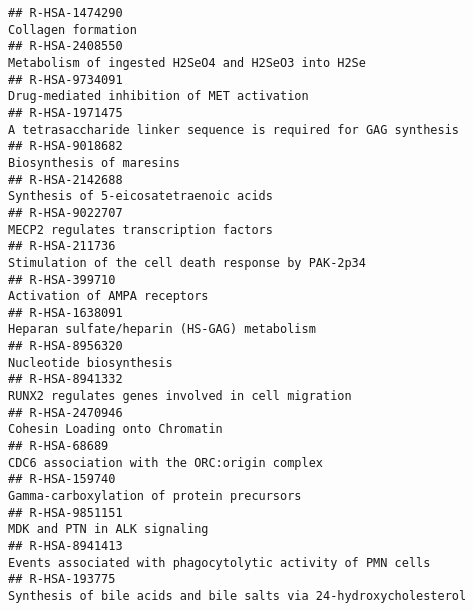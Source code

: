 \documentclass[
]{article}
\begin{document}
\begin{verbatim}
## R-HSA-1474290                                                                                                                   Collagen formation
## R-HSA-2408550                                                                                   Metabolism of ingested H2SeO4 and H2SeO3 into H2Se
## R-HSA-9734091                                                                                           Drug-mediated inhibition of MET activation
## R-HSA-1971475                                                                      A tetrasaccharide linker sequence is required for GAG synthesis
## R-HSA-9018682                                                                                                             Biosynthesis of maresins
## R-HSA-2142688                                                                                                Synthesis of 5-eicosatetraenoic acids
## R-HSA-9022707                                                                                                MECP2 regulates transcription factors
## R-HSA-211736                                                                                    Stimulation of the cell death response by PAK-2p34
## R-HSA-399710                                                                                                          Activation of AMPA receptors
## R-HSA-1638091                                                                                          Heparan sulfate/heparin (HS-GAG) metabolism
## R-HSA-8956320                                                                                                              Nucleotide biosynthesis
## R-HSA-8941332                                                                                     RUNX2 regulates genes involved in cell migration
## R-HSA-2470946                                                                                                       Cohesin Loading onto Chromatin
## R-HSA-68689                                                                                           CDC6 association with the ORC:origin complex
## R-HSA-159740                                                                                             Gamma-carboxylation of protein precursors
## R-HSA-9851151                                                                                                         MDK and PTN in ALK signaling
## R-HSA-8941413                                                                          Events associated with phagocytolytic activity of PMN cells
## R-HSA-193775                                                                      Synthesis of bile acids and bile salts via 24-hydroxycholesterol

\end{verbatim}
\end{document}
